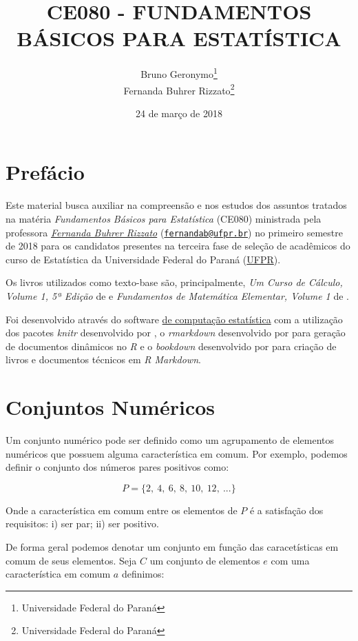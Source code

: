 \documentclass[]{book}
\title{CE080 - FUNDAMENTOS BÁSICOS PARA ESTATÍSTICA}
\author{Bruno Geronymo\footnote{Universidade Federal do Paraná} \\ Fernanda Buhrer Rizzato\footnote{Universidade Federal do Paraná}}
\date{24 de março de 2018}
\begin{document}
\maketitle

{
\setcounter{tocdepth}{1}
\tableofcontents
}
\chapter*{Prefácio}\label{prefacio}

Este material busca auxiliar na compreensão e nos estudos dos assuntos
tratados na matéria \emph{Fundamentos Básicos para Estatística} (CE080)
ministrada pela professora
\href{http://leg.ufpr.br/doku.php/pessoais:fernanda}{\emph{Fernanda
Buhrer Rizzato}}
(\href{mailto:fernandab@ufpr.br}{\nolinkurl{fernandab@ufpr.br}}) no
primeiro semestre de 2018 para os candidatos presentes na terceira fase
de seleção de acadêmicos do curso de Estatística da Universidade Federal
do Paraná (\href{http://www.ufpr.br/}{UFPR}).

Os livros utilizados como texto-base são, principalmente, \emph{Um Curso
de Cálculo, Volume 1, 5ª Edição} de \citet{guidorizzi2013curso} e
\emph{Fundamentos de Matemática Elementar, Volume 1} de
\citet{iezzi2004fundamentos}.

Foi desenvolvido através do software
\href{https://www.r-project.org/}{\citet{R-base} de computação
estatística} com a utilização dos pacotes \emph{knitr} desenvolvido por
\citet{R-knitr}, o \emph{rmarkdown} desenvolvido por \citet{R-rmarkdown}
para geração de documentos dinâmicos no \emph{R} e o \emph{bookdown}
desenvolvido por \citet{R-bookdown} para criação de livros e documentos
técnicos em \emph{R Markdown}.

\chapter{Conjuntos Numéricos}\label{conjuntos-numericos}

Um conjunto numérico pode ser definido como um agrupamento de elementos
numéricos que possuem alguma característica em comum. Por exemplo,
podemos definir o conjunto dos números pares positivos como:

\[P = \{ 2,\ 4,\ 6,\ 8,\ 10,\ 12,\ ...\}\]

Onde a característica em comum entre os elementos de \(P\) é a
satisfação dos requisitos: i) ser par; ii) ser positivo.

De forma geral podemos denotar um conjunto em função das caracetísticas
em comum de seus elementos. Seja \(C\) um conjunto de elementos \(e\)
com uma característica em comum \(a\) definimos:
\end{document}
